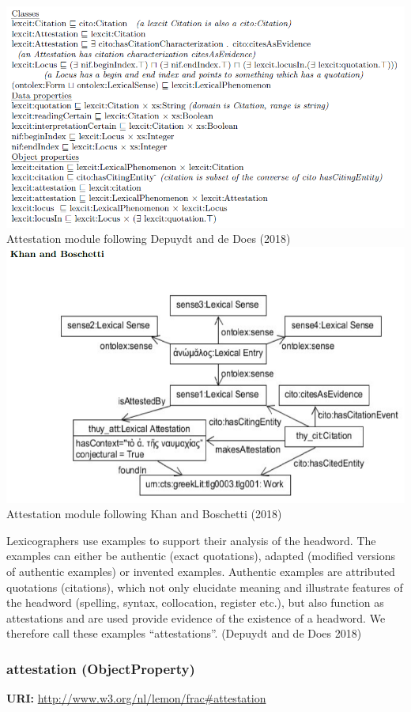 \documentclass[a4paper]{article}
\newcommand\textstyleStrongEmphasis[1]{\textbf{#1}}
\begin{document}
 \includegraphics{index-img/index-img003.png} Attestation module following Depuydt and de Does (2018)  \includegraphics{index-img/index-img004.png} Attestation module following Khan and Boschetti (2018) 

{\textquotedbl}Lexicographers use examples to support their analysis of the headword. The examples can either be authentic (exact quotations), adapted (modified versions of authentic examples) or invented examples. Authentic examples are attributed quotations (citations), which not only elucidate meaning and illustrate features of the headword (spelling, syntax, collocation, register etc.), but also function as attestations and are used provide evidence of the existence of a headword. We therefore call these examples “attestations”.{\textquotedbl} (Depuydt and de Does 2018) 

\subsubsection[attestation (ObjectProperty)]{attestation (ObjectProperty)}
\textstyleStrongEmphasis{URI:} \url{http://www.w3.org/nl/lemon/frac#attestation}
\end{document}
